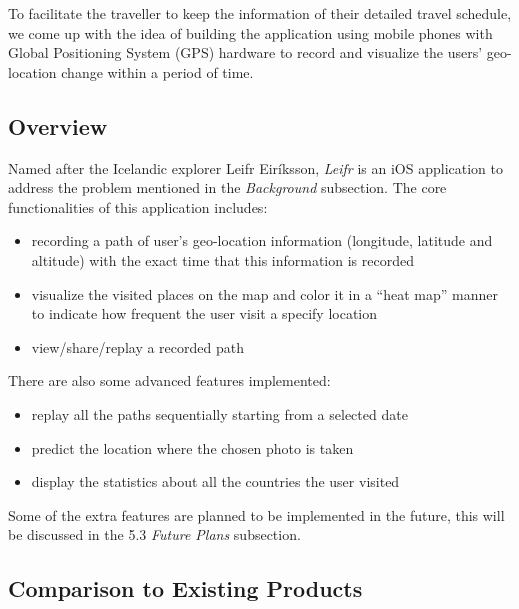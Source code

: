 \documentclass[12pt,a4paper]{article}
\begin{document}
            To facilitate the traveller to keep the information of their detailed travel schedule, we come up with the idea of building the application using mobile phones with Global Positioning System (GPS) hardware to record and visualize the users' geo-location change within a period of time.
	  
	   \subsection{Overview}
	        Named after the Icelandic explorer Leifr Eiríksson, \textit{Leifr} is an iOS application to address the problem mentioned in the \textit{Background} subsection. The core functionalities of this application includes:
	        \begin{itemize}
                \setlength\itemsep{-0.5em}
                \item recording a path of user's geo-location information (longitude, latitude and altitude) with the exact time that this information is recorded
                \item visualize the visited places on the map and color it in a ``heat map'' manner to indicate how frequent the user visit a specify location
                \item view/share/replay a recorded path
            \end{itemize}
            
            There are also some advanced features implemented:
            \begin{itemize}
                \setlength\itemsep{-0.5em}
                \item replay all the paths sequentially starting from a selected date
                \item predict the location where the chosen photo is taken
                \item display the statistics about all the countries the user visited
            \end{itemize}
            
            Some of the extra features are planned to be implemented in the future, this will be discussed in the 5.3 \textit{Future Plans} subsection.
	        
	   \subsection{Comparison to Existing Products}
	        
    \clearpage
    
\end{document}

